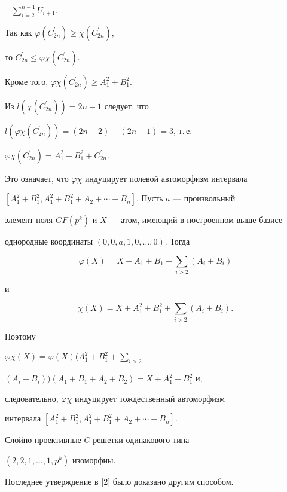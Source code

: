 \begin{pf}
$+\sum\limits_{i=2}^{n-1}U_{i+1}$.


Так как $\varphi(C_{2n}^{\prime}) \geq \chi(C_{2n}^{\prime}),$


то $C_{2n}^{\prime} \leq \varphi \chi(C_{2n}^{\prime})$.


Кроме того, $\varphi \chi(C_{2n}^{\prime}) \geq A_1^2+B_1^2$.


Из $l(\chi(C_{2n}^{\prime}))=2n-1$ следует, что


$l(\varphi \chi(C_{2n}^{\prime}))=(2n+2)-(2n-1)=3$, т.\,е.


$\varphi \chi(C_{2n}^{\prime})=A_1^2+B_1^2+C_{2n}^{\prime}$.


Это означает, что $\varphi \chi$ индуцирует полевой автоморфизм интервала


$[A_1^2+B_1^2,A_1^2+B_1^2+A_2+\dotsb+B_n]$. Пусть $a$ --- произвольный


элемент поля $GF(p^k)$ и $X$ --- атом, имеющий в построенном выше базисе


однородные координаты $(0,0,a,1,0,\dotsc,0)$. Тогда


$$


\varphi(X)=X+A_1+B_1+\sum_{i>2}(A_i+B_i)


$$


и


$$


\chi(X)=X+A_1^2+B_1^2+\sum_{i>2}(A_i+B_i).


$$


Поэтому


$\varphi \chi(X)=\varphi(X) \Big(A_1^2+B_1^2+\sum\limits_{i>2}$


$(A_i+B_i)\Big)(A_1+B_1+A_2+B_2)=X+A_1^2+B_1^2$ и,


следовательно, $\varphi \chi $ индуцирует тождественный автоморфизм


интервала $[A_1^2+B_1^2,A_1^2+B_1^2+A_2+\dotsb+B_n]$.


\end{pf}





\begin{cornonum}


Слойно проективные $C$-решетки одинакового типа


$(2,2,1,\dotsc,1,p^k)$ изоморфны.


\end{cornonum}





Последнее утверждение в [2] было доказано другим способом.





